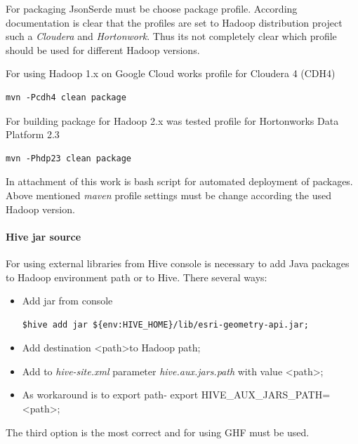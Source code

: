 \documentclass[a4paper,12pt,oneside]{report}
\begin{document}
For packaging JsonSerde 
must be choose package profile. According documentation is clear that the profiles are set to Hadoop distribution project such a \textit{Cloudera} and \textit{Hortonwork}. Thus its not completely clear which profile should be used for different Hadoop versions. 

For using Hadoop 1.x on Google Cloud works profile for Cloudera 4 (CDH4)
\begin{footnotesize}
\begin{lstlisting}[style=python]
mvn -Pcdh4 clean package
\end{lstlisting}
\end{footnotesize}
For building package for Hadoop 2.x was tested profile for Hortonworks Data Platform 2.3
\begin{footnotesize}
\begin{lstlisting}[style=python]
mvn -Phdp23 clean package
\end{lstlisting}
\end{footnotesize}

In attachment of this work is bash script for automated deployment of packages. Above mentioned \textit{maven} profile settings must be change according the used Hadoop version.

\paragraph{Hive jar source} For using external libraries from Hive console is necessary to add Java packages to Hadoop environment path or to Hive. There several ways:
\begin{itemize}
\item Add jar from console 
\begin{footnotesize}
\begin{lstlisting}[style=python]
$hive add jar ${env:HIVE_HOME}/lib/esri-geometry-api.jar;
\end{lstlisting}
\end{footnotesize}
\item Add destination \textless path\textgreater to Hadoop path;
\item Add to \textit{hive-site.xml} parameter \textit{hive.aux.jars.path} with value \textless path\textgreater;
\item As workaround is to export path-  export HIVE\_AUX\_JARS\_PATH= \textless path\textgreater; 
\end{itemize}
The third option is the most correct and for using GHF must be used.
\end{document}
